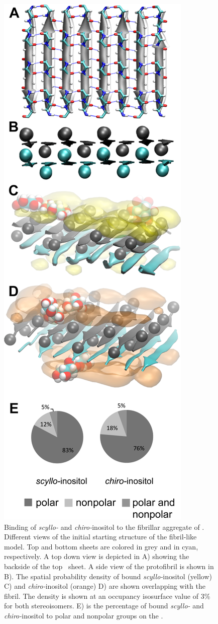 \begin{figure}[htbp]
  \centering
  \includegraphics[scale=0.75]{figures/results1/GA4_paper_figures_submitted-6}
  \caption[Binding of \textit{scyllo-} and \textit{chiro-}inositol to the fibrillar aggregate of \gafour.]{Binding of \textit{scyllo-} and \textit{chiro-}inositol to the fibrillar aggregate of \gafour. Different views of the initial starting structure of the fibril-like model. Top and bottom sheets are colored in grey and in cyan, respectively. A top down view is depicted in A) showing the backside of the top \gafour\ sheet. A side view of the protofibril is shown in B). The spatial probability density of bound \textit{scyllo-}inositol (yellow) C) and \textit{chiro-}inositol (orange) D) are shown overlapping with the fibril. The density is shown at an occupancy isosurface value of 3\% for both stereoisomers. E) is the percentage of bound \textit{scyllo-} and \textit{chiro-}inositol to polar and nonpolar groups on the \bsheet.}

\end{figure}
